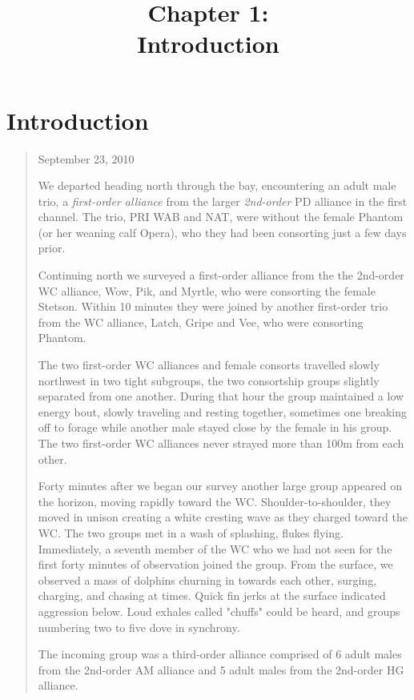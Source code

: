 \documentclass[11pt]{amsart}
\title{Chapter 1: \\ Introduction}
\date{}
\begin{document}
\maketitle

\section{Introduction}

\begin{quote}
September 23, 2010

We departed heading north through the bay, encountering an adult male trio, a \textit{first-order alliance} from the larger \textit{2nd-order} PD alliance in the first channel. The trio, PRI WAB and NAT, were without the female Phantom (or her weaning calf Opera), who they had been consorting just a few days prior.

Continuing north we surveyed a first-order alliance from the the 2nd-order WC alliance, Wow, Pik, and Myrtle, who were consorting the female Stetson. Within 10 minutes they were joined by another first-order trio from the WC alliance, Latch, Gripe and Vee, who were consorting Phantom. 

The two first-order WC alliances and female consorts travelled slowly northwest in two tight subgroups, the two consortship groups slightly separated from one another. During that hour the group maintained a low energy bout, slowly traveling and resting together, sometimes one breaking off to forage while another male stayed close by the female in his group. The two first-order WC alliances never strayed more than 100m from each other. 

Forty minutes after we began our survey another large group appeared on the horizon, moving rapidly toward the WC. Shoulder-to-shoulder, they moved in unison creating a white cresting wave as they charged toward the WC. The two groups met in a wash of splashing, flukes flying. Immediately, a seventh member of the WC who we had not seen for the first forty minutes of observation joined the group. From the surface, we observed a mass of dolphins churning in towards each other, surging, charging, and chasing at times. Quick fin jerks at the surface indicated aggression below. Loud exhales called "chuffs" could be heard, and groups numbering two to five dove in synchrony. 

The incoming group was a third-order alliance comprised of 6 adult males from the 2nd-order AM alliance and 5 adult males from the 2nd-order HG alliance.


\end{quote}
\end{document}

